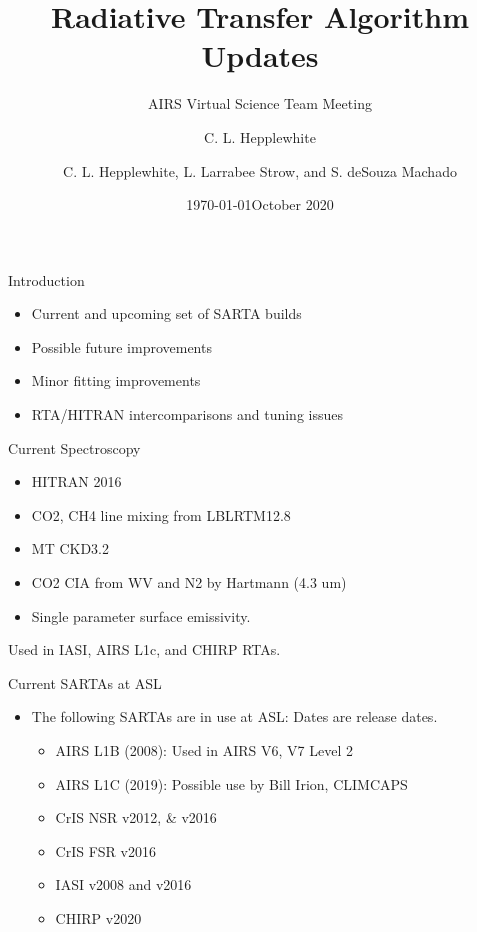 \documentclass[10pt,t]{beamer}
\author{C. L. Hepplewhite}
\date{\today}
\title{\large Radiative Transfer Algorithm Updates}
\subtitle{\footnotesize{AIRS Virtual Science Team Meeting}}
\date{\vspace{0.1in}\footnotesize{October 2020 \vfill}}
\author{C. L. Hepplewhite\inst{1,2}, L. Larrabee Strow\inst{1,2}, and S. deSouza Machado\inst{1,2} }
\institute[UMBC]{\inst{1} UMBC Physics Dept. \and \inst{2}UMBC JCET}
\begin{document}
\maketitle

\begin{frame}{Introduction}
\begin{itemize}
  \item Current and upcoming set of SARTA builds 
  \item Possible future improvements 
  \item Minor fitting improvements
  \item RTA/HITRAN intercomparisons and tuning issues
\end{itemize}

\end{frame}
\begin{frame}{Current Spectroscopy}
  \begin{itemize}
  \item HITRAN 2016
  \item CO2, CH4 line mixing from LBLRTM12.8
  \item MT CKD3.2
  \item CO2 CIA from WV and N2 by Hartmann (4.3 um)
  \item Single parameter surface emissivity.
  \end{itemize}

Used in IASI, AIRS L1c, and CHIRP RTAs.

\end{frame}
\begin{frame}{Current SARTAs at ASL}

  \begin{itemize}
  \item The following SARTAs are in use at ASL:
    Dates are release dates.
    \begin{itemize}
    \item AIRS L1B (2008):  Used in AIRS V6, V7 Level 2
    \item AIRS L1C (2019):  Possible use by Bill Irion, CLIMCAPS
    \item CrIS NSR v2012, \& v2016  
    \item CrIS FSR v2016
    \item IASI v2008 and v2016
    \item CHIRP v2020
    \end{itemize}
  \end{itemize}
\end{frame}
\end{document}
